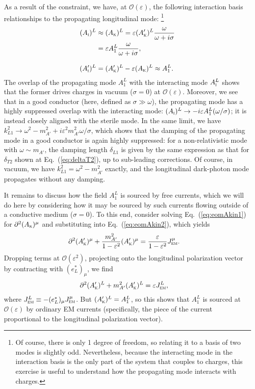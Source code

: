 \documentclass[amsmath,amssymb,aps,10pt,prd,letterpaper,nofootinbib,balancelastpage,notitlepage,superscriptaddress,twocolumn,floatfix]{revtex4-2}
\renewcommand{\eqref}[2][]{Eq{#1}.~(\ref{eq:#2})}	%
\newcommand{\tsc}[1]{\textsc{#1}}
\newcommand{\kin}[1]{({#1}_{\textsc{k}})}
\newcommand{\primekin}[1]{({#1}_{\textsc{k}}^\prime)}
\newcommand{\inter}[1]{({#1}_{\textsc{i}})}
\newcommand{\primeinter}[1]{({#1}_{\textsc{i}}^\prime)}
\begin{document}
As a result of the constraint, we have, at $\mathcal{O}(\varepsilon)$, the following interaction basis relationships to the propagating longitudinal mode:%
\footnote{\label{ftnt:twoModesAreOne}%
    Of course, there is only 1 degree of freedom, so relating it to a basis of two modes is slightly odd.
    Nevertheless, because the interacting mode in the interaction basis is the only part of the system that couples to charges, this exercise is useful to understand how the propagating mode interacts with charges.
} %
\begin{align}
    \inter{A}^L &\approx \kin{A}^L =  \varepsilon \primekin{A}^L \frac{\omega}{ \omega + i \sigma } \nonumber\\
    &= \varepsilon A_{1}^{L} \frac{\omega}{ \omega + i \sigma },\\[2ex]
    \primeinter{A}^L &= \primekin{A}^L - \varepsilon \kin{A}^L \approx  A_{1}^L .
\end{align}
The overlap of the propagating mode $A_{1}^{L}$ with the interacting mode $A_{\tsc{i}}^L$ shows that the former drives charges in vacuum ($\sigma=0$) at $\mathcal{O}(\varepsilon)$.
Moreover, we see that in a good conductor (here, defined as $\sigma \gg \omega$), the propagating mode has a highly suppressed overlap with the interacting mode: $\inter{A}^L\rightarrow - i \varepsilon A_{1}^{L} (\omega / \sigma)$; it is instead closely aligned with the sterile mode.
In the same limit, we have $k_{L1}^2 \rightarrow \omega^2 - m_{A'}^2 + i \varepsilon^2 m_{A'}^2 \omega / \sigma$, which shows that the damping of the propagating mode in a good conductor is again highly suppressed: for a non-relativistic mode with $\omega \sim m_{A'}$, the damping length $\delta_{L1}$ is given by the same expression as that for $\delta_{T2}$ shown at \eqref{deltaT2}, up to sub-leading corrections.
Of course, in vacuum, we have $k_{L1}^2 = \omega^2 - m_{A'}^2$ exactly, and the longitudinal dark-photon mode propagates without any damping.

It remains to discuss how the field $A_{1}^{L}$ is sourced by free currents, which we will do here by considering how it may be sourced by such currents flowing outside of a conductive medium ($\sigma = 0$).
To this end, consider solving \eqref{eomAkin1} for $\partial^2 \kin{A}^{\mu}$ and substituting into \eqref{eomAkin2}, which yields
\begin{align}
    \partial^2 \primekin{A}^\mu + \frac{m_{A'}^2}{1-\varepsilon^2} \primekin{A}^\mu &=  \frac{\varepsilon}{1-\varepsilon^2} J_{\tsc{em}}^\mu.
\end{align}
Dropping terms at $\mathcal{O}(\varepsilon^2)$, projecting onto the longitudinal polarization vector by contracting with $(e_L^*)_\mu$, we find
\begin{align}
    \partial^2 \primekin{A}^L + m_{A'}^2 \primekin{A}^L &= \varepsilon J^L_{\tsc{em}},
\end{align}
where $J^L_{\tsc{em}} \equiv -(e_L^*)_\mu J_{\tsc{em}}^\mu$.
But $\primekin{A}^L = A_{1}^L$, so this shows that $A_{1}^L$ is sourced at $\mathcal{O}(\varepsilon)$ by ordinary EM currents (specifically, the piece of the current proportional to the longitudinal polarization vector).
\end{document}
